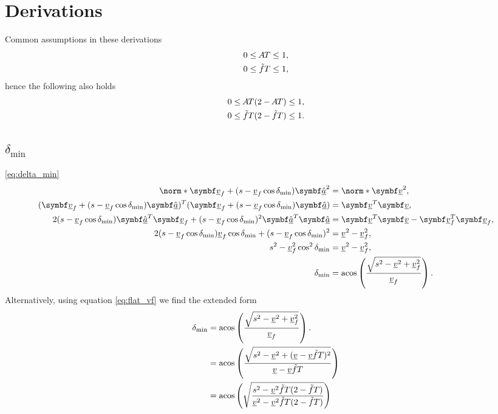 \section{Derivations}
\label{app:derivations}
Common assumptions in these derivations
\begin{align}
\label{eq:assump_accel_1}
0 \le \mathmakebox[\widthof{$\tilde{f}$}]{A}T \le 1,\\
\label{eq:assump_friction_1}
0 \le \tilde{f}T \le 1,
\end{align}
hence the following also holds
\begin{align}
\label{eq:assump_accel_2}
0 \le \mathmakebox[\widthof{$\tilde{f}$}]{A}T (2 - \mathmakebox[\widthof{$\tilde{f}$}]{A} T) \le 1,\\
\label{eq:assump_friction_2}
0 \le \tilde{f}T(2 - \tilde{f}T) \le 1.
\end{align}


\subsection{\texorpdfstring{$\delta_{\min}$}{delta\_min}}
\label{app:derive_delta_min}
\eqref{eq:delta_min}
\begin{align*}
\norm*{\vec{\flat{v}}_f + (s - \flat{v}_f \cos\delta_{\min})\uvec{\flat{a}}}^2 &= \norm*{\vec{\flat{v}}}^2,\\
(\vec{\flat{v}}_f + (s - \flat{v}_f \cos\delta_{\min})\uvec{\flat{a}})^T (\vec{\flat{v}}_f + (s - \flat{v}_f \cos\delta_{\min})\uvec{\flat{a}}) &= \vec{\flat{v}}^T \vec{\flat{v}},\\
2(s - \flat{v}_f \cos\delta_{\min}) \uvec{\flat{a}}^T \vec{\flat{v}}_f + (s - \flat{v}_f \cos\delta_{\min})^2 \uvec{\flat{a}}^T \uvec{\flat{a}} &= \vec{\flat{v}}^T \vec{\flat{v}} - \vec{\flat{v}}_f^T \vec{\flat{v}}_f,\\
2(s - \flat{v}_f \cos\delta_{\min}) \flat{v}_f \cos\delta_{\min} + (s - \flat{v}_f \cos\delta_{\min})^2 &= \flat{v}^2 - \flat{v}_f^2,\\
s^2 - \flat{v}_f^2 \cos^2\delta_{\min} &= \flat{v}^2 - \flat{v}_f^2,\\
\delta_{\min} &= \acos\left(\frac{\sqrt{s^2 - \flat{v}^2 + \flat{v}_f^2}}{\flat{v}_f} \right).
\end{align*}
Alternatively, using equation \eqref{eq:flat_vf} we find the extended form
\begin{align*}
\delta_{\min} &= \acos\left(\frac{\sqrt{s^2 - \flat{v}^2 + \flat{v}_f^2}}{\flat{v}_f} \right).\\
&= \acos\left(\frac{\sqrt{s^2 - \flat{v}^2 + (\flat{v} - \flat{v}\tilde{f}T)^2}}{\flat{v} - \flat{v}\tilde{f}T} \right)\\
&= \acos\left(\sqrt{\frac{s^2 - \flat{v}^2\tilde{f}T(2 - \tilde{f}T)}{\flat{v}^2 - \flat{v}^2\tilde{f}T(2 - \tilde{f}T)}} \right)\\
\end{align*}

